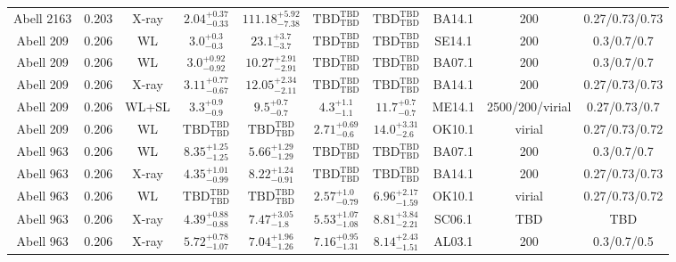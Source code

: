 \begin{table}
\begin{tabular}{cccccccccc}
Abell 2163 & 0.203 & X-ray & ${2.04}^{+0.37}_{-0.33}$ & ${111.18}^{+5.92}_{-7.38}$ & ${\mathrm{TBD}}^{\mathrm{TBD}}_{\mathrm{TBD}}$ & ${\mathrm{TBD}}^{\mathrm{TBD}}_{\mathrm{TBD}}$ & BA14.1 & 200 & 0.27/0.73/0.73 \\
Abell 209 & 0.206 & WL & ${3.0}^{+0.3}_{-0.3}$ & ${23.1}^{+3.7}_{-3.7}$ & ${\mathrm{TBD}}^{\mathrm{TBD}}_{\mathrm{TBD}}$ & ${\mathrm{TBD}}^{\mathrm{TBD}}_{\mathrm{TBD}}$ & SE14.1 & 200 & 0.3/0.7/0.7 \\
Abell 209 & 0.206 & WL & ${3.0}^{+0.92}_{-0.92}$ & ${10.27}^{+2.91}_{-2.91}$ & ${\mathrm{TBD}}^{\mathrm{TBD}}_{\mathrm{TBD}}$ & ${\mathrm{TBD}}^{\mathrm{TBD}}_{\mathrm{TBD}}$ & BA07.1 & 200 & 0.3/0.7/0.7 \\
Abell 209 & 0.206 & X-ray & ${3.11}^{+0.77}_{-0.67}$ & ${12.05}^{+2.34}_{-2.11}$ & ${\mathrm{TBD}}^{\mathrm{TBD}}_{\mathrm{TBD}}$ & ${\mathrm{TBD}}^{\mathrm{TBD}}_{\mathrm{TBD}}$ & BA14.1 & 200 & 0.27/0.73/0.73 \\
Abell 209 & 0.206 & WL+SL & ${3.3}^{+0.9}_{-0.9}$ & ${9.5}^{+0.7}_{-0.7}$ & ${4.3}^{+1.1}_{-1.1}$ & ${11.7}^{+0.7}_{-0.7}$ & ME14.1 & 2500/200/virial & 0.27/0.73/0.7 \\
Abell 209 & 0.206 & WL & ${\mathrm{TBD}}^{\mathrm{TBD}}_{\mathrm{TBD}}$ & ${\mathrm{TBD}}^{\mathrm{TBD}}_{\mathrm{TBD}}$ & ${2.71}^{+0.69}_{-0.6}$ & ${14.0}^{+3.31}_{-2.6}$ & OK10.1 & virial & 0.27/0.73/0.72 \\
Abell 963 & 0.206 & WL & ${8.35}^{+1.25}_{-1.25}$ & ${5.66}^{+1.29}_{-1.29}$ & ${\mathrm{TBD}}^{\mathrm{TBD}}_{\mathrm{TBD}}$ & ${\mathrm{TBD}}^{\mathrm{TBD}}_{\mathrm{TBD}}$ & BA07.1 & 200 & 0.3/0.7/0.7 \\
Abell 963 & 0.206 & X-ray & ${4.35}^{+1.01}_{-0.99}$ & ${8.22}^{+1.24}_{-0.91}$ & ${\mathrm{TBD}}^{\mathrm{TBD}}_{\mathrm{TBD}}$ & ${\mathrm{TBD}}^{\mathrm{TBD}}_{\mathrm{TBD}}$ & BA14.1 & 200 & 0.27/0.73/0.73 \\
Abell 963 & 0.206 & WL & ${\mathrm{TBD}}^{\mathrm{TBD}}_{\mathrm{TBD}}$ & ${\mathrm{TBD}}^{\mathrm{TBD}}_{\mathrm{TBD}}$ & ${2.57}^{+1.0}_{-0.79}$ & ${6.96}^{+2.17}_{-1.59}$ & OK10.1 & virial & 0.27/0.73/0.72 \\
Abell 963 & 0.206 & X-ray & ${4.39}^{+0.88}_{-0.88}$ & ${7.47}^{+3.05}_{-1.8}$ & ${5.53}^{+1.07}_{-1.08}$ & ${8.81}^{+3.84}_{-2.21}$ & SC06.1 & TBD & TBD \\
Abell 963 & 0.206 & X-ray & ${5.72}^{+0.78}_{-1.07}$ & ${7.04}^{+1.96}_{-1.26}$ & ${7.16}^{+0.95}_{-1.31}$ & ${8.14}^{+2.43}_{-1.51}$ & AL03.1 & 200 & 0.3/0.7/0.5 \\

\end{tabular}
\end{table}

